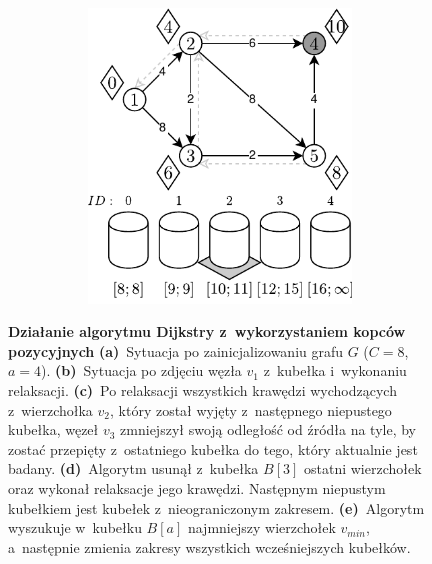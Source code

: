 \begin{figure}[!ht]
\begin{subfigure}[b]{\textwidth}
\begin{subfigure}[b]{0.32\textwidth}
			\caption{}
			\label{fig:exampleRadixHeapC:e}
		\end{subfigure}
		\hfill
		\begin{subfigure}[b]{0.32\textwidth}
			\includegraphics[width=\textwidth]{Chapter_II/RADIX-HEAP-C-Example/f.pdf}
			\caption{}
			\label{fig:exampleRadixHeapC:f}
		\end{subfigure}
		\hfill\null
	\end{subfigure}
	\caption{
		\textbf{Działanie algorytmu Dijkstry z~wykorzystaniem kopców pozycyjnych}
		\textbf{(a)}~Sytuacja po zainicjalizowaniu grafu $G$ ($C=8$, $a=4$).
		\textbf{(b)}~Sytuacja po zdjęciu węzła $v_{1}$ z~kubełka i~wykonaniu relaksacji.
		\textbf{(c)}~Po relaksacji wszystkich krawędzi wychodzących z~wierzchołka $v_{2}$, który został wyjęty z~następnego niepustego kubełka, węzeł $v_{3}$ zmniejszył swoją odległość od źródła na tyle, by zostać przepięty z~ostatniego kubełka do tego, który aktualnie jest badany.
		\textbf{(d)}~Algorytm usunął z~kubełka $B \left[ 3 \right]$ ostatni wierzchołek oraz wykonał relaksacje jego krawędzi.
		Następnym niepustym kubełkiem jest kubełek z~nieograniczonym zakresem.
		\textbf{(e)}~Algorytm wyszukuje w~kubełku $B \left[ a \right]$ najmniejszy wierzchołek $v_{min}$, a~następnie zmienia zakresy wszystkich wcześniejszych kubełków.
}
\end{figure}
